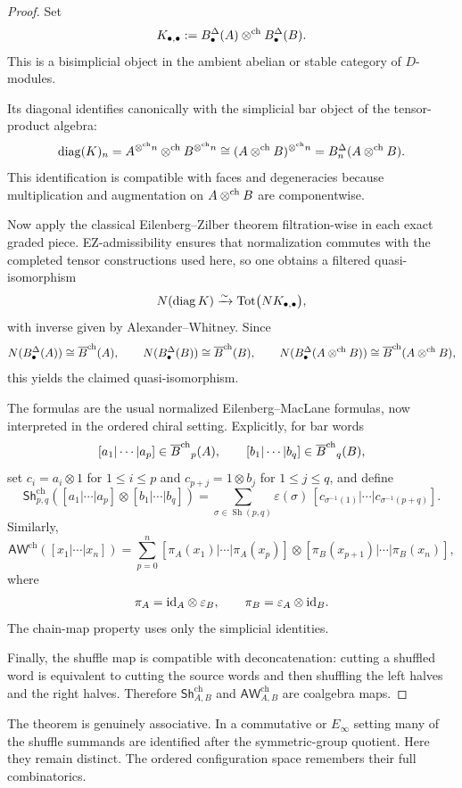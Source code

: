 \begin{proof}
Set
\[
K_{\bullet,\bullet}:=B^\Delta_\bullet(A)\mathbin{\otimes^{\mathrm{ch}}} B^\Delta_\bullet(B).
\]
This is a bisimplicial object in the ambient abelian or stable category of $D$-modules.

Its diagonal identifies canonically with the simplicial bar object of the tensor-product algebra:
\[
\operatorname{diag}(K)_n
=
A^{\mathbin{\otimes^{\mathrm{ch}}} n}\mathbin{\otimes^{\mathrm{ch}}} B^{\mathbin{\otimes^{\mathrm{ch}}} n}
\cong
(A\mathbin{\otimes^{\mathrm{ch}}} B)^{\mathbin{\otimes^{\mathrm{ch}}} n}
=
B^\Delta_n(A\mathbin{\otimes^{\mathrm{ch}}} B).
\]
This identification is compatible with faces and degeneracies because multiplication and augmentation
on $A\mathbin{\otimes^{\mathrm{ch}}} B$ are componentwise.

Now apply the classical Eilenberg--Zilber theorem filtration-wise in each exact graded piece.
EZ-admissibility ensures that normalization commutes with the completed tensor constructions used
here, so one obtains a filtered quasi-isomorphism
\[
N(\operatorname{diag}K)\xrightarrow{\sim} \operatorname{Tot}\bigl(NK_{\bullet,\bullet}\bigr),
\]
with inverse given by Alexander--Whitney. Since
\[
N(B^\Delta_\bullet(A))\cong \overline{B}^{\mathrm{ch}}(A),
\qquad
N(B^\Delta_\bullet(B))\cong \overline{B}^{\mathrm{ch}}(B),
\qquad
N(B^\Delta_\bullet(A\mathbin{\otimes^{\mathrm{ch}}} B))\cong \overline{B}^{\mathrm{ch}}(A\mathbin{\otimes^{\mathrm{ch}}} B),
\]
this yields the claimed quasi-isomorphism.

The formulas are the usual normalized Eilenberg--MacLane formulas, now interpreted in the ordered
chiral setting. Explicitly, for bar words
\[
[a_1|\cdots|a_p]\in {\overline{B}^{\mathrm{ch}}}_p(A),\qquad [b_1|\cdots|b_q]\in {\overline{B}^{\mathrm{ch}}}_q(B),
\]
set $c_i=a_i\otimes 1$ for $1\leq i\leq p$ and $c_{p+j}=1\otimes b_j$ for $1\leq j\leq q$, and define
\[
\mathsf{Sh}^{\mathrm{ch}}_{p,q}
([a_1|\cdots|a_p]\otimes[b_1|\cdots|b_q])
=
\sum_{\sigma\in \operatorname{Sh}(p,q)}
\varepsilon(\sigma)\,
[c_{\sigma^{-1}(1)}|\cdots|c_{\sigma^{-1}(p+q)}].
\]
Similarly,
\[
\mathsf{AW}^{\mathrm{ch}}([x_1|\cdots|x_n])
=
\sum_{p=0}^n
[\pi_A(x_1)|\cdots|\pi_A(x_p)]\otimes[\pi_B(x_{p+1})|\cdots|\pi_B(x_n)],
\]
where
\[
\pi_A=\mathrm{id}_A\otimes \varepsilon_B,\qquad \pi_B=\varepsilon_A\otimes \mathrm{id}_B.
\]
The chain-map property uses only the simplicial identities.

Finally, the shuffle map is compatible with deconcatenation: cutting a shuffled word is equivalent to
cutting the source words and then shuffling the left halves and the right halves. Therefore
$\mathsf{Sh}^{\mathrm{ch}}_{A,B}$ and $\mathsf{AW}^{\mathrm{ch}}_{A,B}$ are coalgebra maps.
\end{proof}

\begin{remark}
The theorem is genuinely associative. In a commutative or $E_\infty$ setting many of the shuffle
summands are identified after the symmetric-group quotient. Here they remain distinct. The ordered
configuration space remembers their full combinatorics.
\end{remark}

